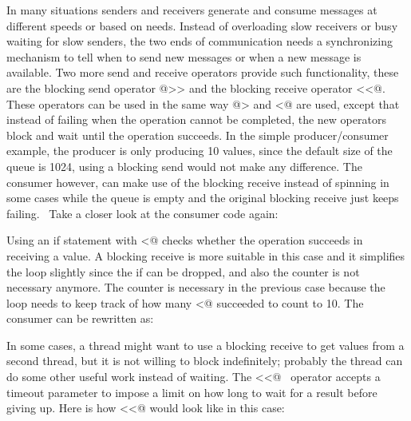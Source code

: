 In many situations senders and receivers generate and consume messages
at different speeds or based on needs. Instead of overloading slow
receivers or busy waiting for slow senders, the two ends of
communication needs a synchronizing mechanism to tell when to send new
messages or when a new message is available. Two more send and receive
operators provide such functionality, these are the blocking send
operator \textsf{@{\textgreater}{\textgreater}} and the
blocking receive operator
\textsf{{\textless}{\textless}@.} These operators can
be used in the same way \textsf{@{\textgreater}} and
\textsf{{\textless}@} are used, except that instead of
failing when the operation cannot be completed, the new operators block
and wait until the operation succeeds. In the simple producer/consumer
example, the producer is only producing 10 values, since the default
size of the queue is 1024, using a blocking send would not make any
difference. The consumer however, can make use of the blocking receive
instead of spinning in some cases while the queue is empty and the
original blocking receive just keeps failing. \ Take a closer look at
the consumer code again:


Using an \textsf{if} statement with
\textsf{{\textless}@}  checks whether the
operation succeeds in receiving a value. A blocking receive is more
suitable in this case and it simplifies the loop slightly since the
\textsf{if} can be dropped, and also the counter is not
necessary anymore. The counter is necessary in the previous case
because the loop needs to keep track of how many
\textsf{{\textless}@} succeeded to count to 10. The
consumer can be rewritten as:


In some cases, a thread might want to use a blocking receive to get
values from a second thread, but it is not willing to block
indefinitely; probably the thread can do some other useful work instead
of waiting. The \textsf{{\textless}{\textless}@}
\ operator accepts a timeout parameter to impose a limit on how long to
wait for a result before giving up. Here is how
\textsf{{\textless}{\textless}@} would look like in
this case:

